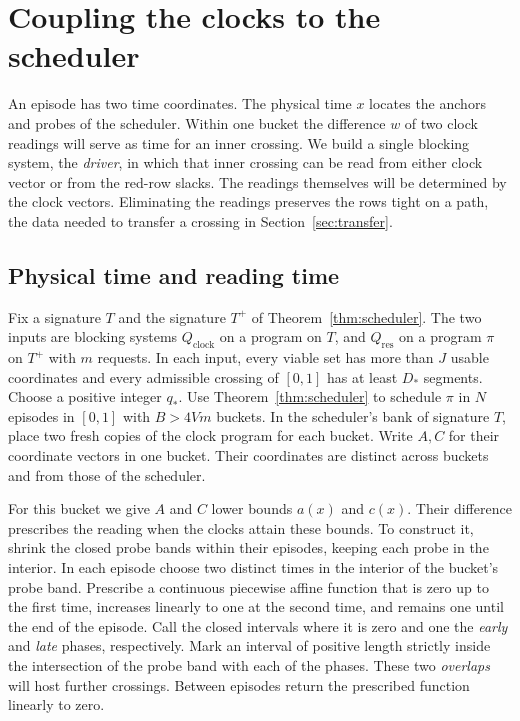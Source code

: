 \section{Coupling the clocks to the scheduler}\label{sec:coupling}

An episode has two time coordinates. The physical time \(x\) locates the
anchors and probes of the scheduler. Within one bucket the difference
\(w\) of two clock readings will serve as time for an inner crossing.
We build a single blocking system, the \emph{driver}, in which that
inner crossing can be read from either clock vector or from the red-row
slacks. The readings themselves will be determined by the clock vectors.
Eliminating the readings preserves the rows tight on a path, the data
needed to transfer a crossing in Section~\ref{sec:transfer}.

\subsection{Physical time and reading time}

Fix a signature \(T\) and the signature \(T^+\) of
Theorem~\ref{thm:scheduler}. The two inputs are blocking systems
\(Q_{\mathrm{clock}}\) on a program on \(T\), and \(Q_{\mathrm{res}}\)
on a program \(\pi\) on \(T^+\) with \(m\) requests. In each input,
every viable set has more than \(J\) usable coordinates and every
admissible crossing of \([0,1]\) has at least \(D_*\) segments.
Choose a positive integer \(q_*\). Use Theorem~\ref{thm:scheduler}
to schedule \(\pi\) in \(N\) episodes in \([0,1]\) with \(B>4Vm\)
buckets. In the scheduler's bank of signature \(T\), place two fresh
copies of the clock program for each bucket. Write \(A,C\) for their
coordinate vectors in one bucket. Their coordinates are distinct
across buckets and from those of the scheduler.

For this bucket we give \(A\) and \(C\) lower bounds \(a(x)\) and
\(c(x)\). Their difference prescribes the reading when the clocks attain
these bounds. To construct it, shrink the closed probe bands within
their episodes, keeping each probe in the interior. In each episode
choose two distinct times in the interior of the bucket's probe band.
Prescribe a continuous piecewise affine function that is zero up to
the first time, increases linearly to one at the second time, and
remains one until the end of the episode. Call the closed intervals
where it is zero and one the \emph{early} and \emph{late} phases,
respectively. Mark an interval of positive length strictly inside the
intersection of the probe band with each of the phases. These two
\emph{overlaps} will host further crossings. Between episodes return
the prescribed function linearly to zero.

